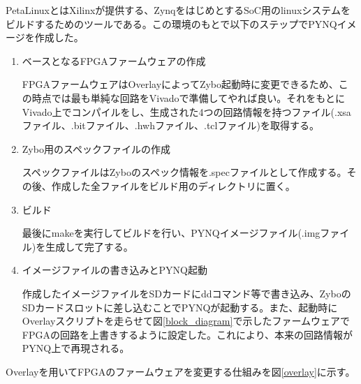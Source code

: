 PetaLinuxとはXilinxが提供する、ZynqをはじめとするSoC用のlinuxシステムをビルドするためのツールである。この環境のもとで以下のステップでPYNQイメージを作成した。
\begin{enumerate}
  \item ベースとなるFPGAファームウェアの作成

  FPGAファームウェアはOverlayによってZybo起動時に変更できるため、この時点では最も単純な回路をVivadoで準備してやれば良い。それをもとにVivado上でコンパイルをし、生成された4つの回路情報を持つファイル(.xsaファイル、.bitファイル、.hwhファイル、.tclファイル)を取得する。
  \item Zybo用のスペックファイルの作成

  スペックファイルはZyboのスペック情報を.specファイルとして作成する。その後、作成した全ファイルをビルド用のディレクトリに置く。
  \item ビルド

  最後にmakeを実行してビルドを行い、PYNQイメージファイル(.imgファイル)を生成して完了する。
  \item イメージファイルの書き込みとPYNQ起動

  作成したイメージファイルをSDカードにddコマンド等で書き込み、ZyboのSDカードスロットに差し込むことでPYNQが起動する。また、起動時にOverlayスクリプトを走らせて図\ref{block_diagram}で示したファームウェアでFPGAの回路を上書きするように設定した。これにより、本来の回路情報がPYNQ上で再現される。

\end{enumerate}




Overlayを用いてFPGAのファームウェアを変更する仕組みを図\ref{overlay}に示す。

